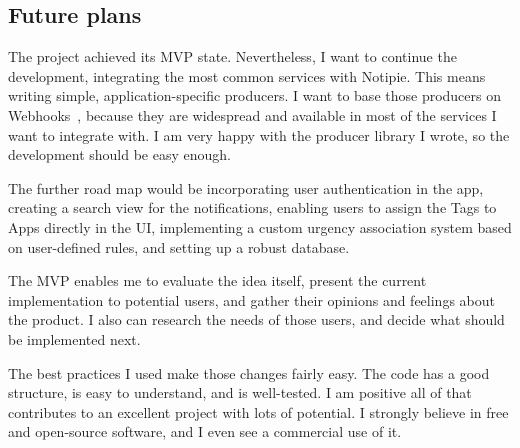 \subsection{Future plans}\label{sec:future-plans}

The project achieved its \ac{MVP} state.
Nevertheless, I want to continue the development,
integrating the most common services
with Notipie.
This means writing simple,
application-specific producers.
I want to base those producers on Webhooks~\cite{lindsay_web_2007},
because they are widespread
and available in most of the services
I want to integrate with.
I am very happy with the producer library I wrote,
so the development should be easy enough.

The further road map would be
incorporating user authentication in the app,
creating a search view for the notifications,
enabling users to assign the Tags to Apps
directly in the \ac{UI},
implementing a custom urgency association system
based on user-defined rules,
and setting up a robust database.

The \ac{MVP} enables me to evaluate the idea itself,
present the current implementation to potential users,
and gather their opinions and feelings about the product.
I also can research the needs of those users,
and decide what should be implemented next.

The best practices I used make those changes
fairly easy.
The code has a good structure,
is easy to understand,
and is well-tested.
I am positive all of that contributes
to an excellent project
with lots of potential.
I strongly believe in
free and open-source software,
and I even see a commercial use of it.
